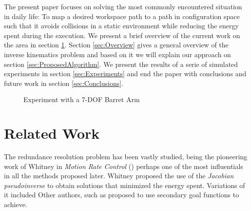 \documentclass[conference]{IEEEtran}
\begin{document}
The present paper focuses on solving the most commonly encountered
situation in daily life: To map a desired workspace path to a path in
configuration space such that it avoids collisions in a static
environment while reducing the energy spent during the execution. We
present a brief overview of the current work on the area in section 
\ref{sec:RelatedWork}. Section \ref{sec:Overview} gives a general overview of
the inverse kinematics problem and based on it we will explain our
approach on section \ref{sec:ProposedAlgorithm}. We present the 
results of a serie of simulated experiments in section \ref{sec:Experiments}
and end the paper with conclusions and future work in section \ref{sec:Conclusions}.

\begin{figure}[]
  \centering
  \caption{ Experiment with a 7-DOF Barret Arm}
  \label{fig:CoverFigure}
\end{figure}


\section{Related Work}
\label{sec:RelatedWork}
The redundance resolution problem has been vastly studied, being the
pioneering work of Whitney in \emph{Motion Rate Control} (\cite{Whitney-motionRate-1969}) perhaps one of the most influentials in all the methods proposed later. 
Whitney proposed the use of the \emph{Jacobian pseudoinverse} to obtain
solutions that minimized the energy spent. Variations of it included   
Other authors, such as \cite{liegeois-ns-1977} proposed to use
secondary goal functions to achieve.
\end{document}
